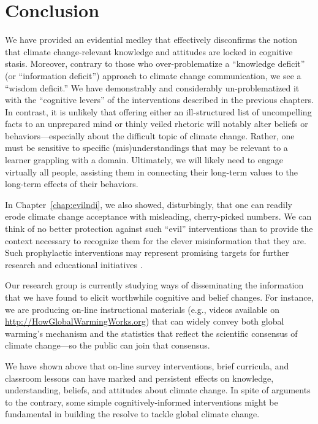 \graphicspath{{conclusion/}}

\chapter{Conclusion}
\label{chap:conclusion}

We have provided an evidential medley that effectively disconfirms the notion
that climate change-relevant knowledge and attitudes are locked in cognitive
stasis. Moreover, contrary to those who over-problematize a ``knowledge
deficit'' (or ``information deficit'') approach to climate change communication,
we see a ``wisdom deficit.'' We have demonstrably and considerably
un-problematized it with the ``cognitive levers'' of the interventions described
in the previous chapters. In contrast, it is unlikely that offering either an
ill-structured list of uncompelling facts to an unprepared mind or thinly veiled
rhetoric \parencite[cf.][]{lord_biased_1979} will notably alter beliefs or
behaviors---especially about the difficult topic of climate change. Rather, one
must be sensitive to specific (mis)understandings that may be relevant to a
learner grappling with a domain.  Ultimately, we will likely need to engage
virtually all people, assisting them in connecting their long-term values to the
long-term effects of their behaviors.

In Chapter~\ref{chap:evilndi}, we also showed, disturbingly, that one can
readily erode climate change acceptance with misleading, cherry-picked numbers.
We can think of no better protection against such ``evil'' interventions than to
provide the context necessary to recognize them for the clever misinformation
that they are. Such prophylactic interventions may represent promising targets
for further research and educational initiatives
\parencite[cf.][]{lewandowsky_misinformation_2012}.

Our research group is currently studying ways of disseminating the information
that we have found to elicit worthwhile cognitive and belief changes.  For
instance, we are producing on-line instructional materials (e.g., videos
available on \url{http://HowGlobalWarmingWorks.org}) that
can widely convey both global warming’s mechanism and the statistics that
reflect the scientific consensus of climate change—so the public can join that
consensus.

We have shown above that on-line survey interventions, brief curricula, and
classroom lessons can have marked and persistent effects on knowledge,
understanding, beliefs, and attitudes about climate change. In spite of
arguments to the contrary, some simple cognitively-informed interventions might
be fundamental in building the resolve to tackle global climate change.

